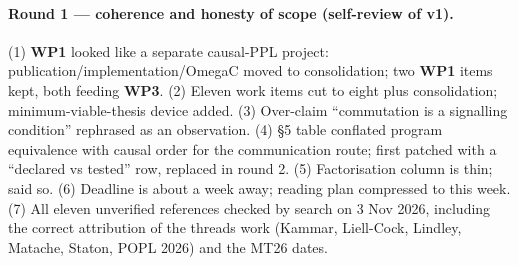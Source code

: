 \documentclass[11pt,a4paper]{article}
\newcommand{\WP}[1]{\textbf{WP#1}}
\begin{document}
\paragraph{Round 1 --- coherence and honesty of scope (self-review of v1).}
(1) \WP{1} looked like a separate causal-PPL project: publication/implementation/OmegaC moved to consolidation; two \WP{1} items kept, both feeding \WP{3}. (2) Eleven work items cut to eight plus consolidation; minimum-viable-thesis device added. (3) Over-claim ``commutation is a signalling condition'' rephrased as an observation. (4) \S5 table conflated program equivalence with causal order for the communication route; first patched with a ``declared vs tested'' row, replaced in round 2. (5) Factorisation column is thin; said so. (6) Deadline is about a week away; reading plan compressed to this week. (7) All eleven unverified references checked by search on 3 Nov 2026, including the correct attribution of the threads work (Kammar, Liell-Cock, Lindley, Matache, Staton, POPL 2026) and the MT26 dates.
\end{document}
